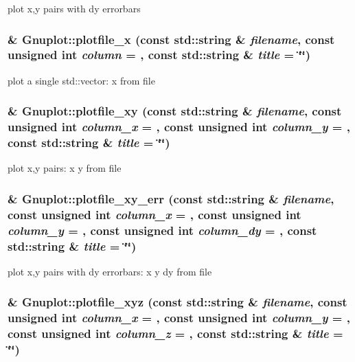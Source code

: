 plot x,y pairs with dy errorbars \hypertarget{class_gnuplot_a4fc34218cdfdd27a65b92eea1f1f9e84}{
\subsubsection[{plotfile\_\-x}]{ \& Gnuplot::plotfile\_\-x (const std::string \& {\em filename}, \/  const unsigned int {\em column} = {}, \/  const std::string \& {\em title} = {\ttfamily \char`\"{}\char`\"{}})}}
\label{class_gnuplot_a4fc34218cdfdd27a65b92eea1f1f9e84}
plot a single std::vector: x from file \hypertarget{class_gnuplot_a10e1fc7344bd726faa2d70cd5ced5e5e}{
\subsubsection[{plotfile\_\-xy}]{ \& Gnuplot::plotfile\_\-xy (const std::string \& {\em filename}, \/  const unsigned int {\em column\_\-x} = {}, \/  const unsigned int {\em column\_\-y} = {}, \/  const std::string \& {\em title} = {\ttfamily \char`\"{}\char`\"{}})}}
\label{class_gnuplot_a10e1fc7344bd726faa2d70cd5ced5e5e}
plot x,y pairs: x y from file \hypertarget{class_gnuplot_afe9d44ba12f617188111ab915010f3ab}{
\subsubsection[{plotfile\_\-xy\_\-err}]{ \& Gnuplot::plotfile\_\-xy\_\-err (const std::string \& {\em filename}, \/  const unsigned int {\em column\_\-x} = {}, \/  const unsigned int {\em column\_\-y} = {}, \/  const unsigned int {\em column\_\-dy} = {}, \/  const std::string \& {\em title} = {\ttfamily \char`\"{}\char`\"{}})}}
\label{class_gnuplot_afe9d44ba12f617188111ab915010f3ab}
plot x,y pairs with dy errorbars: x y dy from file \hypertarget{class_gnuplot_a9dbde2a91eb816481657f3a22c9b0046}{
\subsubsection[{plotfile\_\-xyz}]{ \& Gnuplot::plotfile\_\-xyz (const std::string \& {\em filename}, \/  const unsigned int {\em column\_\-x} = {}, \/  const unsigned int {\em column\_\-y} = {}, \/  const unsigned int {\em column\_\-z} = {}, \/  const std::string \& {\em title} = {\ttfamily \char`\"{}\char`\"{}})}}
